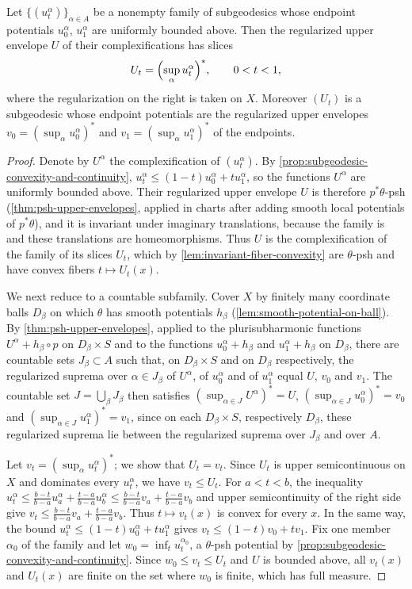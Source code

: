 \begin{lemma}\label{lem:subgeodesic-family-upper-envelope}
Let $\{(u_t^\alpha)\}_{\alpha\in A}$ be a nonempty family of subgeodesics whose endpoint potentials $u_0^\alpha$, $u_1^\alpha$ are uniformly bounded above. Then the regularized upper envelope $U$ of their complexifications has slices
\[
 U_t=\Bigl(\sup_\alpha u_t^\alpha\Bigr)^*,\qquad 0<t<1,
\]
where the regularization on the right is taken on $X$. Moreover $(U_t)$ is a subgeodesic whose endpoint potentials are the regularized upper envelopes $v_0=(\sup_\alpha u_0^\alpha)^*$ and $v_1=(\sup_\alpha u_1^\alpha)^*$ of the endpoints.
\end{lemma}
\begin{proof}
Denote by $U^\alpha$ the complexification of $(u_t^\alpha)$. By \cref{prop:subgeodesic-convexity-and-continuity}, $u_t^\alpha\leq(1-t)u_0^\alpha+tu_1^\alpha$, so the functions $U^\alpha$ are uniformly bounded above. Their regularized upper envelope $U$ is therefore $p^*\theta$-psh (\cref{thm:psh-upper-envelopes}, applied in charts after adding smooth local potentials of $p^*\theta$), and it is invariant under imaginary translations, because the family is and these translations are homeomorphisms. Thus $U$ is the complexification of the family of its slices $U_t$, which by \cref{lem:invariant-fiber-convexity} are $\theta$-psh and have convex fibers $t\mapsto U_t(x)$.

We next reduce to a countable subfamily. Cover $X$ by finitely many coordinate balls $D_\beta$ on which $\theta$ has smooth potentials $h_\beta$ (\cref{lem:smooth-potential-on-ball}). By \cref{thm:psh-upper-envelopes}, applied to the plurisubharmonic functions $U^\alpha+h_\beta\circ p$ on $D_\beta\times S$ and to the functions $u_0^\alpha+h_\beta$ and $u_1^\alpha+h_\beta$ on $D_\beta$, there are countable sets $J_\beta\subset A$ such that, on $D_\beta\times S$ and on $D_\beta$ respectively, the regularized suprema over $\alpha\in J_\beta$ of $U^\alpha$, of $u_0^\alpha$ and of $u_1^\alpha$ equal $U$, $v_0$ and $v_1$. The countable set $J=\bigcup_\beta J_\beta$ then satisfies $(\sup_{\alpha\in J}U^\alpha)^*=U$, $(\sup_{\alpha\in J}u_0^\alpha)^*=v_0$ and $(\sup_{\alpha\in J}u_1^\alpha)^*=v_1$, since on each $D_\beta\times S$, respectively $D_\beta$, these regularized suprema lie between the regularized suprema over $J_\beta$ and over $A$.

Let $v_t=(\sup_\alpha u_t^\alpha)^*$; we show that $U_t=v_t$. Since $U_t$ is upper semicontinuous on $X$ and dominates every $u_t^\alpha$, we have $v_t\leq U_t$. For $a<t<b$, the inequality $u_t^\alpha\leq\frac{b-t}{b-a}u_a^\alpha+\frac{t-a}{b-a}u_b^\alpha\leq\frac{b-t}{b-a}v_a+\frac{t-a}{b-a}v_b$ and upper semicontinuity of the right side give $v_t\leq\frac{b-t}{b-a}v_a+\frac{t-a}{b-a}v_b$. Thus $t\mapsto v_t(x)$ is convex for every $x$. In the same way, the bound $u_t^\alpha\leq(1-t)u_0^\alpha+tu_1^\alpha$ gives $v_t\leq(1-t)v_0+tv_1$. Fix one member $\alpha_0$ of the family and let $w_0=\inf_tu_t^{\alpha_0}$, a $\theta$-psh potential by \cref{prop:subgeodesic-convexity-and-continuity}. Since $w_0\leq v_t\leq U_t$ and $U$ is bounded above, all $v_t(x)$ and $U_t(x)$ are finite on the set where $w_0$ is finite, which has full measure.


\end{proof}
